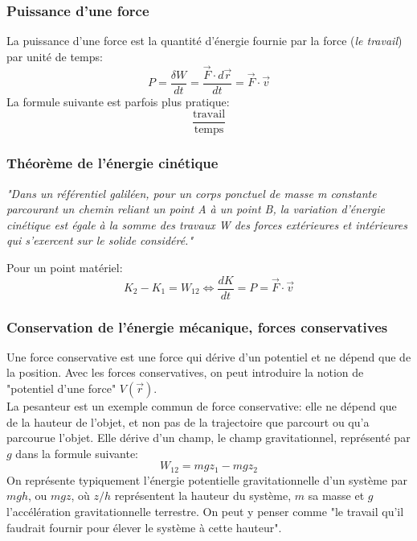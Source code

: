 \documentclass{article}
\numberwithin{equation}{section}
\begin{document}

\subsubsection{Puissance d'une force}
La puissance d'une force est la quantité d'énergie fournie par la force (\emph{le travail}) par unité de temps:
\begin{equation}
	\boxed{ P = \frac{\delta W}{dt} = \frac{\vec F \cdot d \vec r}{dt} = \vec F \cdot \vec v }
\end{equation}
La formule suivante est parfois plus pratique:
\begin{equation}
	\boxed{ \dfrac{\text{travail}}{\text{temps}} }
\end{equation}

\subsubsection{Théorème de l'énergie cinétique}

\begin{center}
	\emph{"Dans un référentiel galiléen, pour un corps ponctuel de masse m constante parcourant un chemin reliant un point A à un point B, la variation d'énergie cinétique est égale à la somme des travaux W des forces extérieures et intérieures qui s'exercent sur le solide considéré."}
\end{center}
Pour un point matériel:
\begin{equation}
	\boxed{ K_2 - K_1 = W_{12} \Leftrightarrow \frac{dK}{dt} = P = \vec F \cdot \vec v }
\end{equation}

\subsubsection{Conservation de l'énergie mécanique, forces conservatives}
Une force conservative est une force qui dérive d'un potentiel et ne dépend que de la position. Avec les forces conservatives, on peut introduire la notion de "potentiel d'une force" \(V(\vec r)\). \\

La pesanteur est un exemple commun de force conservative: elle ne dépend que de la hauteur de l'objet, et non pas de la trajectoire que parcourt ou qu'a parcourue l'objet. Elle dérive d'un champ, le champ gravitationnel, représenté par \(g\) dans la formule suivante:
\begin{equation}
	W_{12} = mgz_1 - mgz_2
\end{equation}
On représente typiquement l'énergie potentielle gravitationnelle d'un système par \(mgh\), ou \(mgz\), où \(z/h\) représentent la hauteur du système, \(m\) sa masse et \(g\) l'accélération gravitationnelle terrestre. On peut y penser comme "le travail qu'il faudrait fournir pour élever le système à cette hauteur". \\
\end{document}
